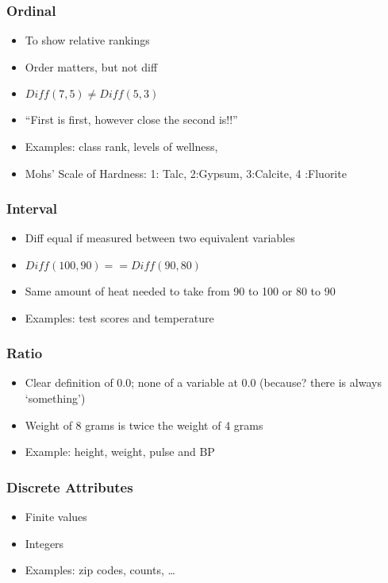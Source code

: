 \begin{frame}[fragile]\frametitle{Ordinal}	

	\begin{itemize}
	\item To show relative rankings 
	\item Order matters, but not diff
	\item $Diff(7,5) \neq Diff(5,3)$
	\item ``First is first, however close the second is!!''
	\item Examples: class rank, levels of wellness, 
\item Mohs' Scale of Hardness:	1: Talc,    2:Gypsum,     3:Calcite,      4 :Fluorite

	\end{itemize}

\end{frame}


\begin{frame}[fragile]\frametitle{Interval}	

	\begin{itemize}
	\item Diff equal if measured between two equivalent variables
	\item $Diff(100,90) == Diff(90,80)$
	\item Same amount of heat needed to take from 90 to 100 or 80 to 90
	\item Examples: test scores and temperature
	\end{itemize}

\end{frame}


\begin{frame}[fragile]\frametitle{Ratio}	

	\begin{itemize}
	\item Clear definition of 0.0; none of a variable at 0.0 (because? there is always `something')
	\item Weight of 8 grams is twice the weight of 4 grams
	\item Example: height, weight, pulse and BP
	\end{itemize}	

\end{frame}


\begin{frame}[fragile] \frametitle{Discrete Attributes}
\begin{itemize}
\item Finite values
\item Integers
\item Examples: zip codes, counts, \ldots
\end{itemize}
\end{frame}


